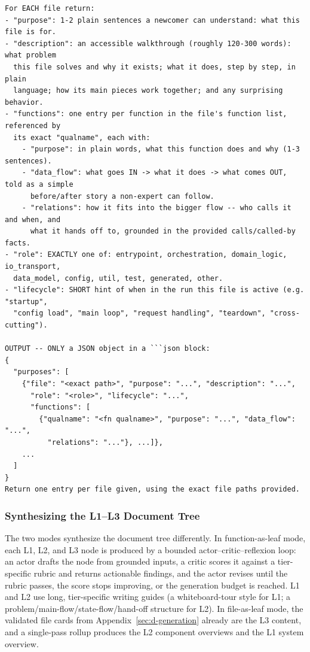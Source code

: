\documentclass[]{ailab}
\newcommand{\hbsmall}{\textsf{function-as-leaf}}
\newcommand{\hblarge}{\textsf{file-as-leaf}}
\begin{document}
\begin{lstlisting}[style=promptbox]
For EACH file return:
- "purpose": 1-2 plain sentences a newcomer can understand: what this file is for.
- "description": an accessible walkthrough (roughly 120-300 words): what problem
  this file solves and why it exists; what it does, step by step, in plain
  language; how its main pieces work together; and any surprising behavior.
- "functions": one entry per function in the file's function list, referenced by
  its exact "qualname", each with:
    - "purpose": in plain words, what this function does and why (1-3 sentences).
    - "data_flow": what goes IN -> what it does -> what comes OUT, told as a simple
      before/after story a non-expert can follow.
    - "relations": how it fits into the bigger flow -- who calls it and when, and
      what it hands off to, grounded in the provided calls/called-by facts.
- "role": EXACTLY one of: entrypoint, orchestration, domain_logic, io_transport,
  data_model, config, util, test, generated, other.
- "lifecycle": SHORT hint of when in the run this file is active (e.g. "startup",
  "config load", "main loop", "request handling", "teardown", "cross-cutting").

OUTPUT -- ONLY a JSON object in a ```json block:
{
  "purposes": [
    {"file": "<exact path>", "purpose": "...", "description": "...",
      "role": "<role>", "lifecycle": "...",
      "functions": [
        {"qualname": "<fn qualname>", "purpose": "...", "data_flow": "...",
          "relations": "..."}, ...]},
    ...
  ]
}
Return one entry per file given, using the exact file paths provided.
\end{lstlisting}

\subsubsection{Synthesizing the L1--L3 Document Tree}

The two modes synthesize the document tree differently. In \hbsmall{} mode, each
L1, L2, and L3 node is produced by a bounded actor--critic--reflexion loop: an
actor drafts the node from grounded inputs, a critic scores it against a
tier-specific rubric and returns actionable findings, and the actor revises until
the rubric passes, the score stops improving, or the generation budget is reached.
L1 and L2 use long, tier-specific writing guides (a whiteboard-tour style for L1;
a problem/main-flow/state-flow/hand-off structure for L2). In \hblarge{} mode, the
validated file cards from Appendix~\ref{sec:d-generation} already are the L3
content, and a single-pass rollup produces the L2 component overviews and the L1
system overview.
\end{document}
